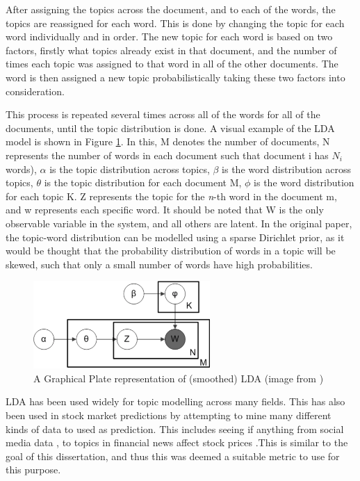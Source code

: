 \noindent After assigning the topics across the document, and to each of the words, the topics are reassigned for each word. This is done by changing the topic for each word individually and in order. The new topic for each word is based on two factors, firstly what topics already exist in that document, and the number of times each topic was assigned to that word in all of the other documents. The word is then assigned a new topic probabilistically taking these two factors into consideration.

\noindent This process is repeated several times across all of the words for all of the documents, until the topic distribution is done. A visual example of the LDA model is shown in Figure \ref{fig:ldafigure}. In this, M denotes the number of documents,
N represents the number of words in each document such that document i has $N_{i}$ words), $\alpha$ is the topic distribution across topics, $\beta$ is the word distribution across topics, $\theta$ is the topic distribution for each document M, $\phi$ is the word distribution for each topic K. Z represents the topic for the \textit{n}-th word in the document m, and w represents each specific word. It should be noted that W is the only observable variable in the system, and all others are latent. In the original paper, the topic-word distribution can be modelled using a sparse Dirichlet prior, as it would be thought that the probability distribution of words in a topic will be skewed, such that only a small number of words have high probabilities. 

\begin{figure}
	\centering
		\includegraphics[width=0.6\textwidth]{images/LDA.png}
	\caption{A Graphical Plate representation of (smoothed) LDA (image from \cite{LDA})}
	\label{fig:ldafigure}
\end{figure}


LDA has been used widely for topic modelling across many fields.  This has also been used in stock market predictions by attempting to mine many different kinds of data to used as prediction. This includes seeing if anything from social media data \cite{nguyen2015sentiment}, to topics in financial news \cite{feuerriegel2016analysis} affect stock prices .This is similar to the goal of this dissertation, and thus this was deemed a suitable metric to use for this purpose. 
